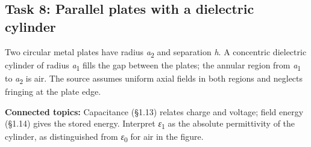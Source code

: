 \documentclass[11pt]{article}
\begin{document}
\begin{keepsection}
\section{Task 8: Parallel plates with a dielectric cylinder}

Two circular metal plates have radius \textit{a}\textsubscript{2} and separation \textit{h}. A concentric dielectric cylinder of radius \textit{a}\textsubscript{1} fills the gap between the plates; the annular region from \textit{a}\textsubscript{1} to \textit{a}\textsubscript{2} is air. The source assumes uniform axial fields in both regions and neglects fringing at the plate edge.

\textbf{Connected topics:} Capacitance (§1.13) relates charge and voltage; field energy (§1.14) gives the stored energy. Interpret \textit{ε}\textsubscript{1} as the absolute permittivity of the cylinder, as distinguished from \textit{ε}\textsubscript{0} for air in the figure.


\end{keepsection}
\end{document}
